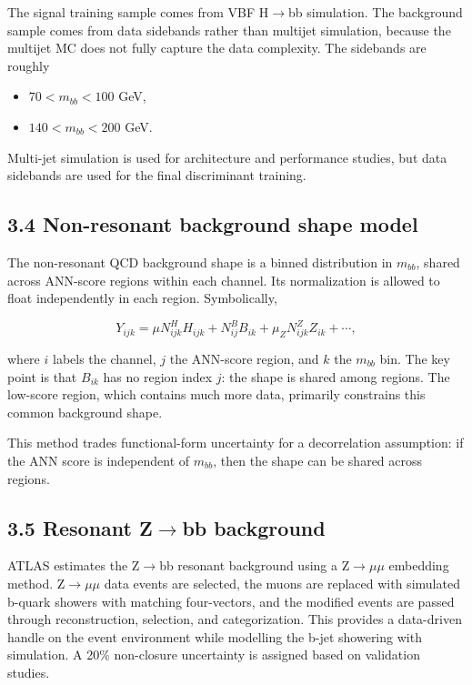 \documentclass[11pt]{article}
\begin{document}
The signal training sample comes from VBF H$\to$bb simulation. The background sample comes from data sidebands rather than multijet simulation, because the multijet MC does not fully capture the data complexity. The sidebands are roughly

\begin{itemize}
\item \(70 < m_{bb} < 100\) GeV,
\item \(140 < m_{bb} < 200\) GeV.
\end{itemize}

Multi-jet simulation is used for architecture and performance studies, but data sidebands are used for the final discriminant training.

\subsection{3.4 Non-resonant background shape model}

The non-resonant QCD background shape is a binned distribution in \(m_{bb}\), shared across ANN-score regions within each channel. Its normalization is allowed to float independently in each region. Symbolically,

\[
Y_{ijk} = \mu N^H_{ijk} H_{ijk} + N^B_{ij} B_{ik} + \mu_Z N^Z_{ijk} Z_{ik} + \cdots,
\]

where \(i\) labels the channel, \(j\) the ANN-score region, and \(k\) the \(m_{bb}\) bin. The key point is that \(B_{ik}\) has no region index \(j\): the shape is shared among regions. The low-score region, which contains much more data, primarily constrains this common background shape.

This method trades functional-form uncertainty for a decorrelation assumption: if the ANN score is independent of \(m_{bb}\), then the shape can be shared across regions.

\subsection{3.5 Resonant Z$\to$bb background}

ATLAS estimates the Z$\to$bb resonant background using a Z$\to$$\mu$$\mu$ embedding method. Z$\to$$\mu$$\mu$ data events are selected, the muons are replaced with simulated b-quark showers with matching four-vectors, and the modified events are passed through reconstruction, selection, and categorization. This provides a data-driven handle on the event environment while modelling the b-jet showering with simulation. A 20\% non-closure uncertainty is assigned based on validation studies.
\end{document}
